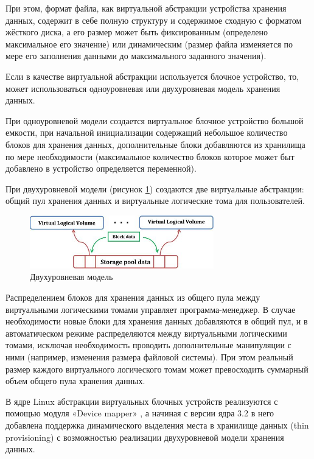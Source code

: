 \documentclass[10pt, a5paper]{article}
\begin{document}
При этом, формат файла, как виртуальной абстракции устройства  хранения данных, содержит в себе полную структуру и содержимое сходную с форматом жёсткого диска, а его размер может быть фиксированным (определено максимальное его значение) или динамическим (размер файла изменяется по мере его заполнения данными до максимального заданного значения).

Если в качестве виртуальной абстракции используется блочное устройство, то, может использоваться одноуровневая или двухуровневая модель  хранения данных.

При одноуровневой модели создается виртуальное блочное \linebreak устройство большой емкости, при начальной инициализации содержащий небольшое количество блоков для хранения данных, дополнительные блоки добавляются из хранилища по мере необходимости (максимальное количество блоков которое может быт добавлено в устройство определяется переменной).

При двухуровневой модели (рисунок \ref{02:klyga:fig1}) создаются две виртуальные абстракции: общий пул хранения данных и виртуальные логические тома для пользователей.

\begin{center}
\begin{figure}[h!]
  \centering
  \includegraphics[width=8cm]{02_klyga_fig1}
  \caption{Двухуровневая модель}
  \label{02:klyga:fig1}
\end{figure}
\end{center} 

Распределением блоков для хранения данных из общего пула между виртуальными логическими томами управляет программа-менеджер. В случае необходимости новые блоки для хранения данных добавляются в общий пул, и в автоматическом режиме распределяются между виртуальными логическими томами, исключая необходимость проводить дополнительные манипуляции с ними (например, изменения размера файловой системы). При этом реальный размер каждого виртуального логического томам может превосходить суммарный объем общего пула хранения данных.

В ядре Linux абстракции виртуальных блочных устройств реализуются с помощью модуля «Device mapper» \cite{bib2}, а начиная с версии ядра 3.2 в него добавлена поддержка динамического выделения места в хранилище данных (thin provisioning) с возможностью реализации двухуровневой модели хранения данных.
\end{document}
